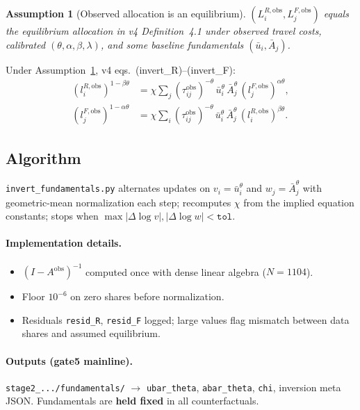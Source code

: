\documentclass[11pt]{article}
\newtheorem{assumption}{Assumption}
\newcommand{\ubar}{\bar u}
\newcommand{\Abar}{\bar A}
\newcommand{\obs}{\mathrm{obs}}
\begin{document}
\begin{assumption}[Observed allocation is an equilibrium]\label{ass:obs_eq}
$(L_i^{R,\obs},L_j^{F,\obs})$ equals the equilibrium allocation in
v4 Definition~4.1 under observed travel costs, calibrated
$(\theta,\alpha,\beta,\lambda)$, and some baseline fundamentals
$(\ubar_i,\Abar_j)$.
\end{assumption}

Under Assumption~\ref{ass:obs_eq}, v4 eqs.\ (invert\_R)--(invert\_F):
\begin{align}
  (l_i^{R,\obs})^{1-\beta\theta}
  &= \chi\sum_j (\tau^{\obs}_{ij})^{-\theta}\,
     \ubar_i^{\theta}\,\Abar_j^{\theta}\,(l_j^{F,\obs})^{\alpha\theta},
  \label{eq:invert_R}\\
  (l_j^{F,\obs})^{1-\alpha\theta}
  &= \chi\sum_i (\tau^{\obs}_{ij})^{-\theta}\,
     \ubar_i^{\theta}\,\Abar_j^{\theta}\,(l_i^{R,\obs})^{\beta\theta}.
  \label{eq:invert_F}
\end{align}

\subsection{Algorithm}

\texttt{invert\_fundamentals.py} alternates updates on
$v_i=\ubar_i^{\theta}$ and $w_j=\Abar_j^{\theta}$ with geometric-mean
normalization each step; recomputes $\chi$ from the implied equation
constants; stops when $\max|\Delta\log v|,|\Delta\log w|<\texttt{tol}$.

\paragraph{Implementation details.}
\begin{itemize}[leftmargin=2em]
  \item $(I-A^{\obs})^{-1}$ computed once with dense linear algebra
        ($N=1104$).
  \item Floor $10^{-6}$ on zero shares before normalization.
  \item Residuals \texttt{resid\_R}, \texttt{resid\_F} logged; large
        values flag mismatch between data shares and assumed equilibrium.
\end{itemize}

\paragraph{Outputs (gate5 mainline).}
\texttt{stage2\_.../fundamentals/} $\rightarrow$
\texttt{ubar\_theta}, \texttt{abar\_theta}, \texttt{chi}, inversion
meta JSON.  Fundamentals are \textbf{held fixed} in all counterfactuals.
\end{document}

